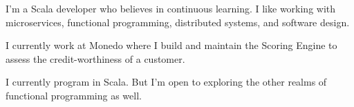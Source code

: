 

\begin{cvparagraph}

I'm a Scala developer who believes in continuous learning. I like working with microservices, functional programming, distributed systems, and software design.

I currently work at Monedo where I build and maintain the Scoring Engine to assess the credit-worthiness of a customer.
    
I currently program in Scala. But I'm open to exploring the other realms of functional programming as well.
\end{cvparagraph}
